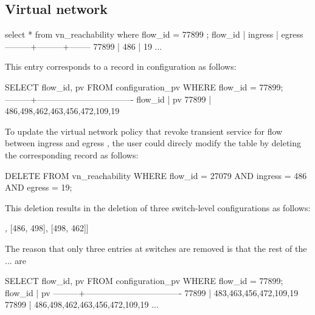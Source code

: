 % 




\subsection{Virtual network}

\begin{sql}
select * from vn_reachability where flow_id = 77899 ;
 flow_id | ingress | egress 
---------+---------+--------
   77899 |     486 |     19  
   ...
\end{sql}

This entry corresponds to a record in configuration as follows:
\begin{sql}
SELECT flow_id, pv FROM configuration_pv WHERE flow_id = 77899;
---------+----------------------------------
 flow_id |                pv                
   77899 | {486,498,462,463,456,472,109,19}
\end{sql}

To update the virtual network policy that revoke transient service for
flow  between ingress  and egress , the user
could direcly modify the  table by deleting the
corresponding record as follows:
\begin{sql}
DELETE FROM vn_reachability WHERE 
        flow_id = 27079 AND ingress = 486 AND egress = 19;  
\end{sql}

This deletion results in the deletion of three switch-level
configurations as follows:
\begin{sql}
[[462, 463], [486, 498], [498, 462]]  
\end{sql}
The reason that only three entries at switches  are
removed is that the rest of the ... are 

\begin{sql}
SELECT flow_id, pv FROM configuration_pv WHERE flow_id = 77899;
 flow_id |                pv                
---------+----------------------------------
   77899 | {483,463,456,472,109,19}
   77899 | {486,498,462,463,456,472,109,19}
   ...
\end{sql}


